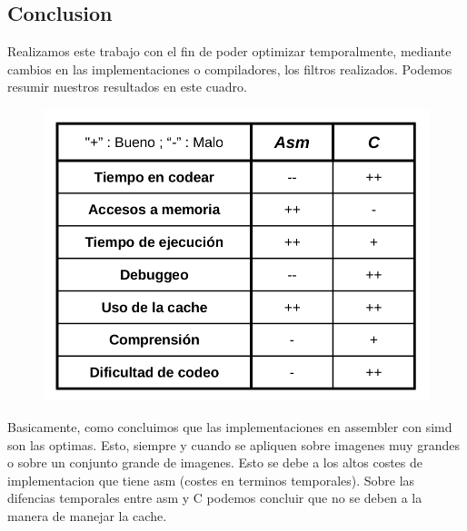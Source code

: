 

\subsection{Conclusion}

Realizamos este trabajo con el fin de poder optimizar temporalmente, mediante cambios en las implementaciones o compiladores, los filtros realizados. Podemos resumir nuestros resultados en este cuadro.


\begin{figure}[H]
\begin{center}
  \includegraphics[width=\linewidth]{conclusion/conclusion.png}
\endminipage
\end{center}
\end{figure}

Basicamente, como concluimos que las implementaciones en assembler con simd son las optimas. Esto, siempre y cuando se apliquen sobre imagenes muy grandes o sobre un conjunto grande de imagenes. Esto se debe a los altos costes de implementacion que tiene asm (costes en terminos temporales). Sobre las difencias temporales entre asm y C podemos concluir que no se deben a la manera de manejar la cache.